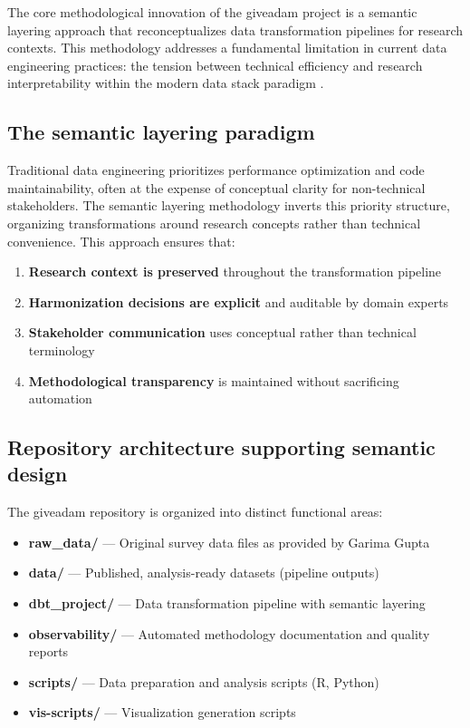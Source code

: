 \documentclass{article}
\begin{document}
The core methodological innovation of the giveadam project is a semantic layering approach that reconceptualizes data transformation pipelines for research contexts. This methodology addresses a fundamental limitation in current data engineering practices: the tension between technical efficiency and research interpretability within the modern data stack paradigm \cite{modern_data_stack_airbyte}.

\subsection{The semantic layering paradigm}
\label{subsec:semantic-paradigm}

Traditional data engineering prioritizes performance optimization and code maintainability, often at the expense of conceptual clarity for non-technical stakeholders. The semantic layering methodology inverts this priority structure, organizing transformations around research concepts rather than technical convenience. This approach ensures that:

\begin{enumerate}
    \item \textbf{Research context is preserved} throughout the transformation pipeline
    \item \textbf{Harmonization decisions are explicit} and auditable by domain experts  
    \item \textbf{Stakeholder communication} uses conceptual rather than technical terminology
    \item \textbf{Methodological transparency} is maintained without sacrificing automation
\end{enumerate}

\subsection{Repository architecture supporting semantic design}
\label{sec:repository-arch}

The giveadam repository is organized into distinct functional areas:

\begin{itemize}
    \item \textbf{raw\_data/} — Original survey data files as provided by Garima Gupta
    \item \textbf{data/} — Published, analysis-ready datasets (pipeline outputs)
    \item \textbf{dbt\_project/} — Data transformation pipeline with semantic layering
    \item \textbf{observability/} — Automated methodology documentation and quality reports
    \item \textbf{scripts/} — Data preparation and analysis scripts (R, Python)
    \item \textbf{vis-scripts/} — Visualization generation scripts
\end{itemize}
\end{document}
